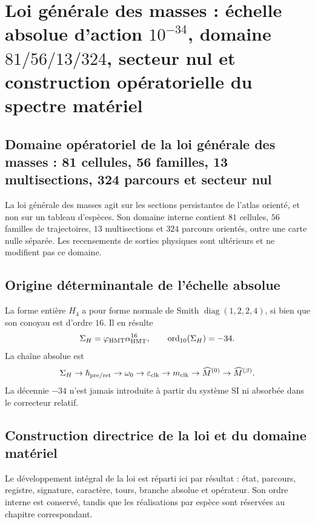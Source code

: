 \chapter{Loi générale des masses : échelle absolue d’action \texorpdfstring{\(10^{-34}\)}{10⁻³⁴}, domaine \texorpdfstring{\(81/56/13/324\)}{81/56/13/324}, secteur nul et construction opératorielle du spectre matériel}
\label{chap:ley-general-masas-dominio-completo}

\section{Domaine opératoriel de la loi générale des masses : 81 cellules, 56 familles, 13 multisections, 324 parcours et secteur nul}
La loi générale des masses agit sur les sections persistantes de l’atlas orienté, et non sur un tableau d’espèces. Son domaine interne contient \(81\) cellules, \(56\) familles de trajectoires, \(13\) multisections et \(324\) parcours orientés, outre une carte nulle séparée. Les recensements de sorties physiques sont ultérieurs et ne modifient pas ce domaine.

\section{Origine déterminantale de l’échelle absolue}
La forme entière \(H_4\) a pour forme normale de Smith \(\operatorname{diag}(1,2,2,4)\), si bien que son conoyau est d’ordre \(16\). Il en résulte
\[
 \Sigma_H=\varphi_{\rm HMT}\alpha_{\rm HMT}^{16},
 \qquad \operatorname{ord}_{10}(\Sigma_H)=-34.
\]
La chaîne absolue est
\[
 \Sigma_H\to\hbar_{\rm pre/ret}\to\omega_0
 \to\varepsilon_{\rm clk}\to m_{\rm clk}
 \to\widehat M^{(0)}\to\widehat M^{(\beta)}.
\]
La décennie \(-34\) n’est jamais introduite à partir du système SI ni absorbée dans le correcteur relatif.

\section{Construction directrice de la loi et du domaine matériel}
Le développement intégral de la loi est réparti ici par résultat : état, parcours, registre, signature, caractère, tours, branche absolue et opérateur. Son ordre interne est conservé, tandis que les réalisations par espèce sont réservées au chapitre correspondant.

